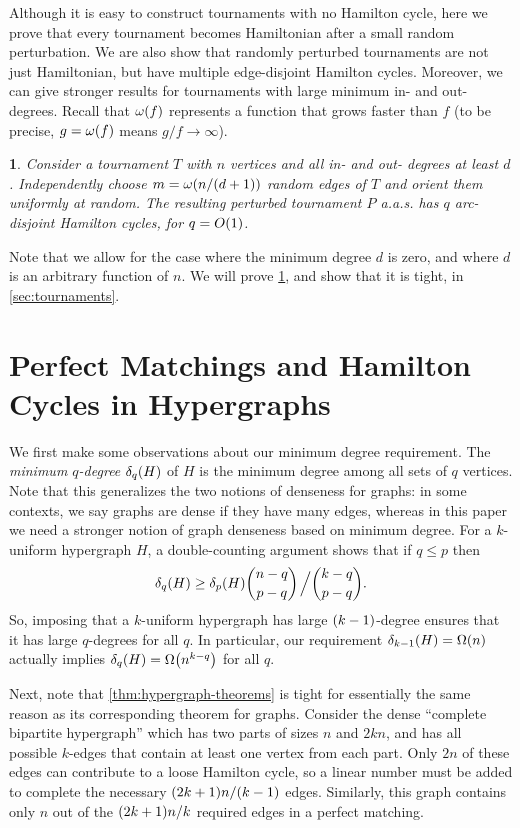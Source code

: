 \documentclass[11pt,english]{article}
\theoremstyle{plain}
\newtheorem{thm}{\protect\theoremname}
\theoremstyle{definition}
\theoremstyle{definition}
\theoremstyle{plain}
\theoremstyle{plain}
\theoremstyle{plain}
\theoremstyle{plain}
\theoremstyle{remark}
\theoremstyle{remark}
\let\originalleft\left
\let\originalright\right
\renewcommand{\left}{\mathopen{}\mathclose\bgroup\originalleft}
\renewcommand{\right}{\aftergroup\egroup\originalright}
\providecommand{\theoremname}{Theorem}
\begin{document}
Although it is easy to construct tournaments with no Hamilton cycle, here we prove 
that every tournament becomes Hamiltonian after a small random perturbation. We are also
show that randomly perturbed tournaments are not just Hamiltonian,
but have multiple edge-disjoint Hamilton cycles.
Moreover, we can give stronger results
for tournaments with large minimum in- and out- degrees. 
Recall that $\omega\left(f\right)$ represents a function that grows faster than 
$f$ (to be precise, $g=\omega\left(f\right)$ means $g/f\to\infty$).
\begin{thm}
\label{thm:tournament}Consider a tournament $T$ with $n$ vertices
and all in- and out- degrees at least $d$. Independently choose
$m=\omega\left(n/\left(d+1\right)\right)$ random edges of $T$ and orient them uniformly at random.
The resulting perturbed tournament $P$ a.a.s. has $q$ arc-disjoint
Hamilton cycles, for $q=O\left(1\right)$.
\end{thm}

Note that we allow for the case where the minimum degree $d$ is zero, and where $d$ is an arbitrary function of $n$. We will prove \ref{thm:tournament}, and show that it is tight, in \ref{sec:tournaments}.


\section{\label{sec:hypergraphs}Perfect Matchings and Hamilton Cycles in
Hypergraphs}

We first make some observations about our minimum degree requirement.
The \emph{minimum $q$-degree} $\delta_{q}\left(H\right)$ of $H$
is the minimum degree among all sets of $q$ vertices. Note that this
generalizes the two notions of denseness for graphs: in some contexts,
we say graphs are dense if they have many edges,
whereas in this paper we need a stronger notion of graph denseness
based on minimum degree. For a $k$-uniform hypergraph
$H$, a double-counting argument shows that if $q\le p$ then
\[
\delta_{q}\left(H\right)\ge\delta_{p}\left(H\right){n-q \choose p-q}\left.\vphantom{\sum}\right/{k-q \choose p-q}.
\]
So, imposing that a $k$-uniform hypergraph has large $\left(k-1\right)$-degree
ensures that it has large $q$-degrees for all $q$. In particular,
our requirement $\delta_{k-1}\left(H\right)=\Omega\left(n\right)$
actually implies $\delta_{q}\left(H\right)=\Omega\left(n^{k-q}\right)$
for all $q$.

Next, note that \ref{thm:hypergraph-theorems} is tight for essentially
the same reason as its corresponding theorem for graphs. Consider the dense ``complete
bipartite hypergraph'' which has two parts of sizes $n$ and
$2kn$, and has all possible $k$-edges that contain at least one
vertex from each part. Only $2n$ of these edges can contribute
to a loose Hamilton cycle, so a linear number must be added to complete
the necessary $\left(2k+1\right)n/\left(k-1\right)$ edges. Similarly, this graph contains only $n$ out of the $\left(2k+1\right)n/k$ required edges in a perfect matching.
\end{document}
